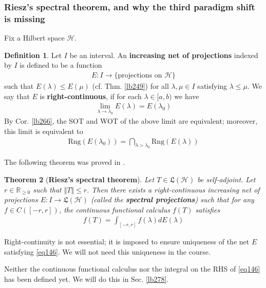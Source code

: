 \documentclass[12pt,b5paper,notitlepage]{article}
\theoremstyle{definition}
\newtheorem{df}{Definition}[subsection]
\theoremstyle{plain}
\newtheorem{thm}[df]{Theorem}
\newcommand{\fk}{\mathfrak}
\newcommand{\Rbb}{\mathbb R}
\newcommand{\Rng}{\mathrm{Rng}}
\newcommand{\MH}{\mathcal H}
\numberwithin{equation}{section}
\begin{document}
\subsubsection{Riesz's spectral theorem, and why the third paradigm shift is missing}


Fix a Hilbert space $\MH$. 

\begin{df}
Let $I$ be an interval. An \textbf{increasing net of projections} indexed by $I$ is defined to be a function
\begin{align*}
E:I\rightarrow\{\text{projections on }\MH\}
\end{align*}
such that $E(\lambda)\leq E(\mu)$ (cf. Thm. \ref{lb249}) for all $\lambda,\mu\in I$ satisfying $\lambda\leq\mu$. We say that $E$ is \textbf{right-continuous}, if for each $\lambda\in[a,b)$ we have
\begin{align}
\lim_{\lambda\rightarrow\lambda_0} E(\lambda)=E(\lambda_0)
\end{align}
By Cor. \ref{lb266}, the SOT and WOT of the above limit are equivalent; moreover, this limit is equivalent to
\begin{align*}
\Rng(E(\lambda_0))=\bigcap_{\lambda>\lambda_0}\Rng(E(\lambda))
\end{align*}
\end{df}


The following theorem was proved in \cite[Ch. V, Sec. 94]{Rie13}.


\begin{thm}[\textbf{Riesz's spectral theorem}]\label{lb267}
Let $T\in\fk L(\MH)$ be self-adjoint. Let $r\in\Rbb_{\geq0}$ such that $\Vert T\Vert\leq r$. Then there exists a right-continuous increasing net of projections $E:I\rightarrow\fk L(\MH)$ (called the \textbf{spectral projections})  such that for any $f\in C([-r,r])$, the continuous functional calculus $f(T)$ satisfies
\begin{align}\label{eq146}
f(T)=\int_{[-r,r]}f(\lambda)dE(\lambda)
\end{align}
\end{thm}

Right-continuity is not essential; it is imposed to ensure uniqueness of the net $E$ satisfying \eqref{eq146}. We will not need this uniqueness in the course.


Neither the continuous functional calculus nor the integral on the RHS of \eqref{eq146} has been defined yet. We will do this in Sec. \ref{lb278}.
\end{document}
